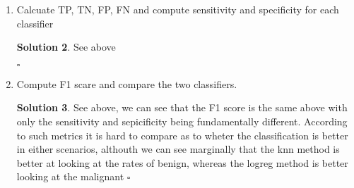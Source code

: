 \documentclass[twoside]{article}
\theoremstyle{definition}
\newtheorem*{solutionT}{Solution}
\newenvironment{solution}{\begin{cBox}\begin{solutionT}}{\hfill{\scriptsize\ensuremath{\square}}\end{solutionT}\end{cBox}}
\theoremstyle{definition}
\begin{document}
\begin{enumerate}
\begin{solution}
\end{solution}
\item Calcuate TP, TN, FP, FN and compute sensitivity and specificity for each classifier
\begin{solution}
See above

\end{solution}
\item Compute F1 scare and compare the two classifiers. 
\begin{solution}
See above, we can see that the F1 score is the same above with only the sensitivity and sepicificity being fundamentally different. According to such metrics it is hard to compare as to wheter the classification is better in either scenarios, althouth we can see marginally that the knn method is better at looking at the rates of benign, whereas the logreg method is better looking at the malignant
\end{solution}
\end{enumerate}
\end{document}
